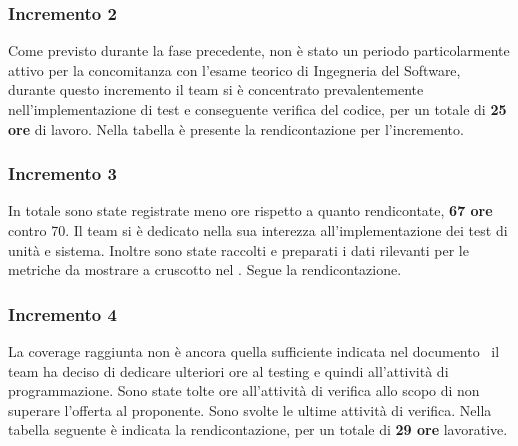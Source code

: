     \subsubsection{Incremento 2}
        Come previsto durante la fase precedente, non è stato un periodo particolarmente attivo per la concomitanza con l'esame teorico di Ingegneria del Software, durante questo incremento il team si è concentrato prevalentemente nell'implementazione di test e conseguente verifica del codice, per un totale di \textbf{25 ore} di lavoro. Nella tabella è presente la rendicontazione per l'incremento.
        \def\salarycontent{
            {Amministratore,4,20,80},
            {Analista,      0,25,0},
            {Progettista,   5,22,110},
            {Programmatore, 10,15,150},
            {Responsabile,  4,30,120},
            {Verificatore,  2,15,30},
            {Totale,        25,127,490},
        }
        
    \subsubsection{Incremento 3}
        In totale sono state registrate meno ore rispetto a quanto rendicontate, \textbf{67 ore} contro 70. Il team si è dedicato nella sua interezza all'implementazione dei test di unità e sistema. Inoltre sono state raccolti e preparati i dati rilevanti per le metriche da mostrare a cruscotto nel \PdQ . Segue la rendicontazione.
        \def\salarycontent{
            {Amministratore,4,20,80},
            {Analista,      0,25,0},
            {Progettista,   10,22,220},
            {Programmatore, 27,15,415},
            {Responsabile,  6,30,180},
            {Verificatore,  20,15,300},
            {Totale,        67,127,1185},
        }
        
    \subsubsection{Incremento 4}
        La coverage raggiunta non è ancora quella sufficiente indicata nel documento \PdQ\ il team ha deciso di dedicare ulteriori ore al testing e quindi all'attività di programmazione. Sono state tolte ore all'attività di verifica allo scopo di non superare l'offerta al proponente. Sono svolte le ultime attività di verifica. Nella tabella seguente è indicata la rendicontazione, per un totale di \textbf{29 ore} lavorative.
        \def\salarycontent{
            {Amministratore,4,20,80},
            {Analista,      0,25,0},
            {Progettista,   0,22,0},
            {Programmatore, 10,15,180},
            {Responsabile,  7,30,210},
            {Verificatore,  8,15,120},
            {Totale,        29,127,560},
        }
        
